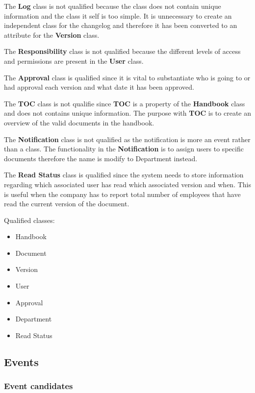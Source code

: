 The \textbf{Log} class is not qualified because the class does not contain unique information and the class it self is too simple. It is unnecessary to create an independent class for the changelog and therefore it has been converted to an attribute for the \textbf{Version} class.
 
The \textbf{Responsibility} class is not qualified because the different levels of access and permissions are present in the \textbf{User} class.

The \textbf{Approval} class is qualified since it is vital to substantiate who is going to or had approval each version and what date it has been approved. 

The \textbf{TOC} class is not qualifie since \textbf{TOC} is a property of the \textbf{Handbook} class and does not contains unique information. The purpose with \textbf{TOC} is to create an overview of the valid documents in the handbook.

The \textbf{Notification} class is not qualified as the notification is more an event rather than a class. The functionality in the \textbf{Notification} is to assign users to specific documents therefore the name is modify to Department instead.

The \textbf{Read Status} class is qualified since the system needs to store information regarding which associated user has read which associated version and when. This is useful when the company has to report total number of employees that have read the current version of the document.

Qualified classes:
\begin{itemize}
  \item Handbook
  \item Document
  \item Version
  \item User
  \item Approval
  \item Department
  \item Read Status
\end{itemize}

\subsection{Events}
\subsubsection{Event candidates}
